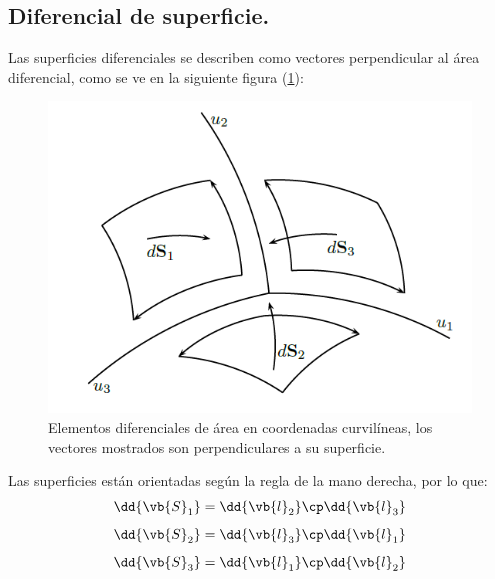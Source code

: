 \subsection{Diferencial de superficie.}

Las superficies diferenciales se describen como vectores perpendicular al área diferencial, como se ve en la siguiente figura (\ref{fig:figura_diferenciales_superficie}):

\begin{figure}[h!]
    \centering
    \includegraphics[scale=0.75]{Imagenes/Diferenciales_Superficie_01.png}
    \caption{Elementos diferenciales de área en coordenadas curvilíneas, los vectores mostrados son perpendiculares a su superficie.}
    \label{fig:figura_diferenciales_superficie}
\end{figure}

Las superficies están orientadas según la regla de la mano derecha, por lo que:
\begin{align*}
\dd{\vb{S}_{1}} &= \dd{\vb{l}_{2}} \cp \dd{\vb{l}_{3}} \\[0.5em] 
\dd{\vb{S}_{2}} &= \dd{\vb{l}_{3}} \cp \dd{\vb{l}_{1}} \\[0.5em]
\dd{\vb{S}_{3}} &= \dd{\vb{l}_{1}} \cp \dd{\vb{l}_{2}}
\end{align*}

